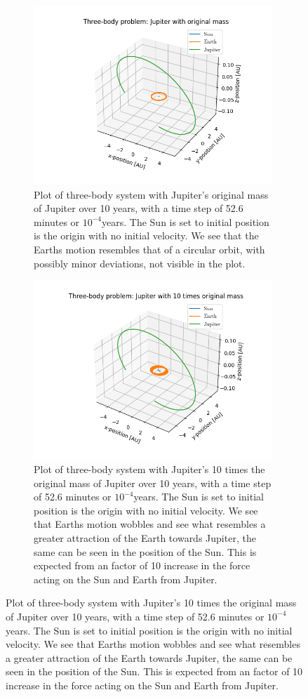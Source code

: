 \documentclass[%
reprint,
nofootinbib,
amsmath,amssymb,
aps,
]{revtex4-1}
\begin{document}
\begin{figure}[t]
	\centering
	\begin{subfigure}{9cm}
		\centering\includegraphics[width=9cm]{../code/classes/figure/TB1.png}
		\caption{Plot of three-body system with Jupiter's original mass of Jupiter over 10 years, with a time step of 52.6 minutes or $10^{-4}$years. The Sun is set to initial position is the origin with no initial velocity. We see that the Earths motion resembles that of a circular orbit, with possibly minor deviations, not visible in the plot. }
		\label{fig:TB1}
	\end{subfigure}%
	\begin{subfigure}{9cm}
		\centering\includegraphics[width=9cm]{../code/classes/figure/TB10.png}
		\caption{Plot of three-body system with Jupiter's 10 times the original mass of Jupiter over 10 years, with a time step of 52.6 minutes or $10^{-4}$years. The Sun is set to initial position is the origin with no initial velocity. We see that Earths motion wobbles and see what resembles a greater attraction of the Earth towards Jupiter, the same can be seen in the position of the Sun. This is expected from an factor of 10 increase in the force acting on the Sun and Earth from Jupiter.}
		\label{fig:TB10}
	\end{subfigure}\vspace{10pt}
	

\end{figure}
\end{document}
